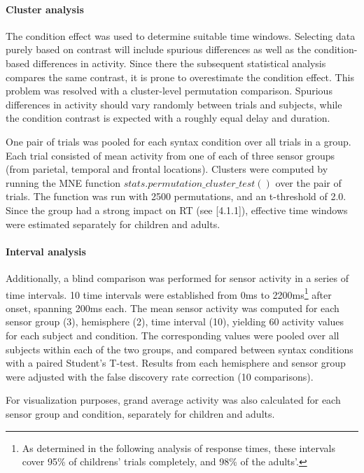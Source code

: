 \paragraph{Cluster analysis}
The condition effect was used to determine suitable time windows.
Selecting data purely based on contrast will include spurious differences as well as the condition-based differences in activity.
Since there the subsequent statistical analysis compares the same contrast, it is prone to overestimate the condition effect.
This problem was resolved with a cluster-level permutation comparison.
Spurious differences in activity should vary randomly between trials and subjects, while the condition contrast is expected with a roughly equal delay and duration.

One pair of trials was pooled for each syntax condition over all trials in a group.
Each trial consisted of mean activity from one of each of three sensor groups (from parietal, temporal and frontal locations).
Clusters were computed by running the MNE function $stats.permutation\_cluster\_test()$ \cite{3.3.clustertest} over the pair of trials.
The function was run with 2500 permutations, and an t-threshold of 2.0.
Since the group had a strong impact on RT (see [4.1.1]), effective time windows were estimated separately for children and adults.

\paragraph{Interval analysis}
Additionally, a blind comparison was performed for sensor activity in a series of time intervals.
10 time intervals were established from 0ms to 2200ms\footnote{As determined in the following analysis of response times, these intervals cover 95\% of childrens' trials completely, and 98\% of the adults'.} after onset, spanning 200ms each.
The mean sensor activity was computed for each sensor group (3), hemisphere (2), time interval (10), yielding 60 activity values for each subject and condition.
The corresponding values were pooled over all subjects within each of the two groups, and compared between syntax conditions with a paired Student's T-test.
Results from each hemisphere and sensor group were adjusted with the false discovery rate correction (10 comparisons).

For visualization purposes, grand average activity was also calculated for each sensor group and condition, separately for children and adults.

